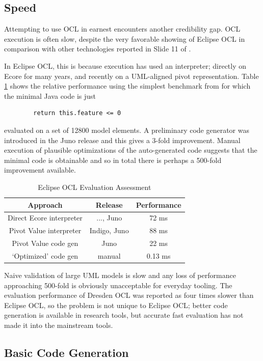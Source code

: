 \documentclass{sig-alternate}
\begin{document}
\subsection{Speed}
Attempting to use OCL in earnest encounters another credibility gap. OCL execution is often slow, despite the very favorable showing of Eclipse OCL in comparison with other technologies reported in Slide 11 of \cite{Rath-Queries}.

In Eclipse OCL, this is because execution has used an interpreter; directly on Ecore for many years, and recently
on a UML-aligned pivot representation. Table \ref{Evaluator performance} shows the relative performance using the simplest benchmark from \cite{Rath-Queries} for which the minimal Java code is just
\begin{verbatim}        return this.feature <= 0\end{verbatim}
 evaluated on a set of 12800 model elements.
A preliminary code generator was introduced in the Juno release and this gives a 3-fold
improvement. Manual execution of plausible optimizations of the auto-generated code suggests that the minimal code is obtainable and so in total there is perhaps a 500-fold improvement available. 

\begin{table}
\centering
\caption{Eclipse OCL Evaluation Assessment}\label{Evaluator performance}
\begin{tabular}{|c|c|c|} \hline
Approach&Release&Performance\\ \hline
Direct Ecore interpreter & ..., Juno & 72 ms\\ \hline
Pivot Value interpreter & Indigo, Juno & 88 ms \\ \hline
Pivot Value code gen & Juno & 22 ms \\ \hline
`Optimized' code gen & manual & 0.13 ms \\ \hline
\end{tabular}
\end{table}

Naive validation of large UML models is slow and any loss of performance approaching 500-fold is
obviously unacceptable for everyday tooling. The evaluation performance of Dresden OCL was reported as four times slower than Eclipse OCL, so the problem is not unique to Eclipse OCL; better code generation  is available in research tools, but
accurate fast evaluation has not made it into the mainstream tools.

\subsection{Basic Code Generation}
\end{document}
